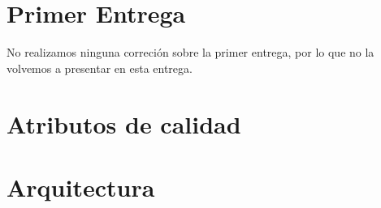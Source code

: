 \documentclass[a4paper]{article}
\begin{document}
\section{Primer Entrega}
No realizamos ninguna correción sobre la primer entrega, por lo que no la volvemos a presentar en esta
entrega.
\newpage
\section{Atributos de calidad}

\section{Arquitectura}



\newpage



\end{document}
